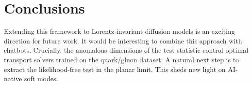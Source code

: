 \section{Conclusions}\label{sec:conclusions}

Extending this framework to Lorentz-invariant diffusion models is an
exciting direction for future work. It would be interesting to combine
this approach with chatbots. Crucially, the anomalous dimensions of the
test statistic control optimal transport solvers trained on the
quark/gluon dataset. A natural next step is to extract the
likelihood-free test in the planar limit. This sheds new light on
AI-native soft modes.

